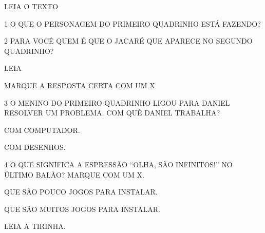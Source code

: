 \begin{escola}

LEIA O TEXTO



\num{1} O QUE O PERSONAGEM DO PRIMEIRO QUADRINHO ESTÁ FAZENDO?


\num{2} PARA VOCÊ QUEM É QUE O JACARÉ QUE APARECE NO SEGUNDO QUADRINHO?


LEIA



MARQUE A RESPOSTA CERTA COM UM X

\num{3} O MENINO DO PRIMEIRO QUADRINHO LIGOU PARA DANIEL RESOLVER UM PROBLEMA. COM QUÊ DANIEL
TRABALHA?

\begin{boxlist}
\boxitem[\rosa{X}] COM COMPUTADOR.

\boxitem[] COM DESENHOS.
\end{boxlist}

\num{4} O QUE SIGNIFICA A ESPRESSÃO “OLHA, SÃO INFINITOS!” NO ÚLTIMO BALÃO? MARQUE COM UM X.

\begin{boxlist}
\boxitem[] QUE SÃO POUCO JOGOS PARA INSTALAR.

\boxitem[\rosa{X}] QUE SÃO MUITOS JOGOS PARA INSTALAR.
\end{boxlist}

LEIA A TIRINHA.





\end{escola}
